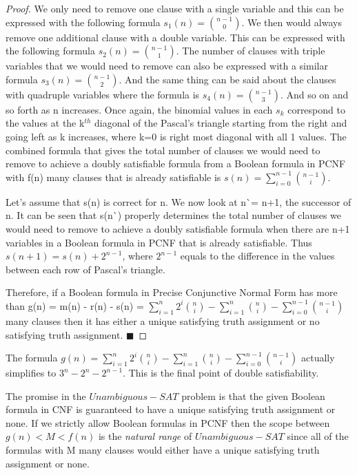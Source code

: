 \documentclass[runningheads,a4paper]{llncs}
\begin{document}
\begin{theorem}
\begin{proof}
We only need to remove one clause with a single variable and this can be expressed with the following formula $s_{1}(n) = \binom{n-1} {0}$. We then would always remove one additional clause with a double variable. This can be expressed with the following formula $s_{2}(n) = \binom{n-1} {1}$. The number of clauses with triple variables that we would need to remove can also be expressed with a similar formula $s_{3}(n) = \binom{n-1} {2}$. And the same thing can be said about the clauses with quadruple variables where the formula is $s_{4}(n) = \binom{n-1} {3}$. And so on and so forth as n increases. Once again, the binomial values in each $s_{k}$ correspond to the values at the k$^{th}$ diagonal of the Pascal's triangle starting from the right and going left as k increases, where k=0 is right most diagonal with all 1 values. The combined formula that gives the total number of clauses we would need to remove to achieve a doubly satisfiable formula from a Boolean formula in PCNF with f(n) many clauses that is already satisfiable is $s(n) = \sum_{i=0}^{n-1} \binom{n-1} {i}$.

Let's assume that s(n) is correct for n. We now look at n\`{}= n+1, the successor of n. It can be seen that s(n\`{}) properly determines the total number of clauses we would need to remove to achieve a doubly satisfiable formula when there are n+1 variables in a Boolean formula in PCNF that is already satisfiable. Thus $s(n+1) = s(n) + 2^{n-1} $, where $2^{n-1}$ equals to the difference in the values between each row of Pascal's triangle. 

Therefore, if a Boolean formula in Precise Conjunctive Normal Form has more than g(n) = m(n) - r(n) - s(n) = $\sum_{i=1}^{n} 2^{i} \binom{n} {i} - \sum_{i=1}^{n} \binom{n} {i} - \sum_{i=0}^{n-1} \binom{n-1} {i} $  many clauses then it has either a unique satisfying truth assignment or no satisfying truth assignment. $\blacksquare$

\end{proof}
\end{theorem}

The formula $ g(n) =  \sum_{i=1}^{n} 2^{i} \binom{n} {i} - \sum_{i=1}^{n} \binom{n} {i} -  \sum_{i=0}^{n-1} \binom{n-1} {i} $ actually simplifies to $3^{n}-2^{n}-2^{n-1}$. This is the final point of double satisfiability. 

\begin{definition}\normalfont

The promise in the ${Unambiguous-SAT}$ problem is that the given Boolean formula in CNF is guaranteed to have a unique satisfying truth assignment or none. If we strictly allow Boolean formulas in PCNF then the scope between $g(n)<M<f(n)$ is the \emph{natural range} of ${Unambiguous-SAT}$ since all of the formulas with M many clauses would either have a unique satisfying truth assignment or none. 

\end{definition}
\end{document}
